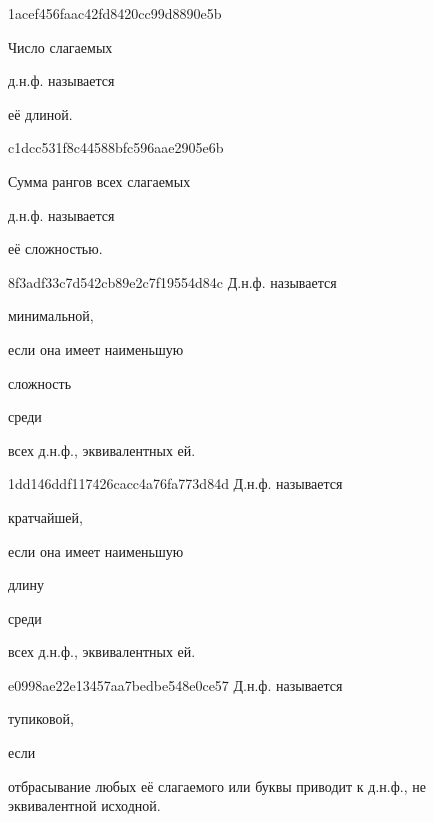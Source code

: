 \begin{note}{1acef456faac42fd8420cc99d8890e5b}
    \begin{icloze}{2}Число слагаемых\end{icloze} д.н.ф. называется \begin{icloze}{1}её длиной.\end{icloze}
\end{note}

\begin{note}{c1dcc531f8c44588bfc596aae2905e6b}
    \begin{icloze}{2}Сумма рангов всех слагаемых\end{icloze} д.н.ф. называется \begin{icloze}{1}её сложностью.\end{icloze}
\end{note}

\begin{note}{8f3adf33c7d542cb89e2c7f19554d84c}
    Д.н.ф. называется \begin{icloze}{3}минимальной,\end{icloze} если она имеет наименьшую \begin{icloze}{1}сложность\end{icloze} среди \begin{icloze}{2}всех д.н.ф., эквивалентных ей.\end{icloze}
\end{note}

\begin{note}{1dd146ddf117426cacc4a76fa773d84d}
    Д.н.ф. называется \begin{icloze}{3}кратчайшей,\end{icloze} если она имеет наименьшую \begin{icloze}{1}длину\end{icloze} среди \begin{icloze}{2}всех д.н.ф., эквивалентных ей.\end{icloze}
\end{note}

\begin{note}{e0998ae22e13457aa7bedbe548e0ce57}
    Д.н.ф. называется \begin{icloze}{2}тупиковой,\end{icloze} если \begin{icloze}{1}отбрасывание любых её слагаемого или буквы приводит к д.н.ф., не эквивалентной исходной.\end{icloze}
\end{note}

